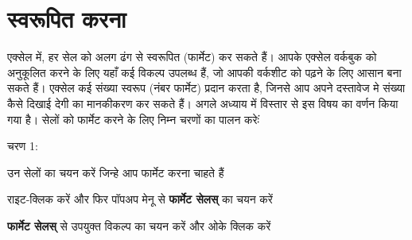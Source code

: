 									
\section{स्वरूपित करना}\label{id-1.21}

एक्सेल में, हर सेल को अलग ढंग से स्वरूपित (फार्मेट) कर सकते हैं। आपके एक्सेल वर्कबुक को अनुकूलित करने के लिए यहाँ कई विकल्प उपलब्ध हैं, जो आपकी वर्कशीट को पढ़ने के लिए आसान बना सकते हैं। एक्सेल कई संख्या स्वरूप (नंबर फार्मेट) प्रदान करता है, जिनसे आप अपने दस्तावेज मे संख्या कैसे दिखाई देगी का मानकीकरण कर सकते हैं। अगले अध्याय में विस्तार से इस विषय का वर्णन किया गया है। सेलों को फार्मेट करने के लिए निम्न चरणों का पालन करेःं

\begin{descriptionSimple}{चरण 1:}
\item[चरण 1] उन सेलों का चयन करें जिन्हे आप फार्मेट करना चाहते हैं
\item[चरण 2] राइट-क्लिक करें और फिर पॉपअप मेनू से \textbf{फार्मेट सेलस्} का चयन करें
\item[चरण 3] \textbf{फार्मेट सेलस्} से उपयुक्त विकल्प का चयन करें और ओके क्लिक करें
\end{descriptionSimple}
